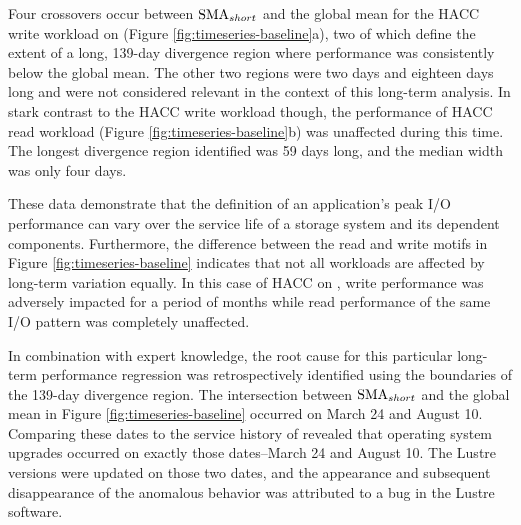 Four crossovers occur between $\textup{SMA}_{short}$ and the global mean for the HACC write workload on \cori (Figure \ref{fig:timeseries-baseline}a), two of which define the extent of a long, 139-day divergence region where performance was consistently below the global mean.
The other two regions were two days and eighteen days long and were not considered relevant in the context of this long-term analysis.
In stark contrast to the HACC write workload though, the performance of HACC read workload (Figure \ref{fig:timeseries-baseline}b) was unaffected during this time.
The longest divergence region identified was 59 days long, and the median width was only four days.

These data demonstrate that the definition of an application's peak I/O performance can vary over the service life of a storage system and its dependent components.
Furthermore, the difference between the read and write motifs in Figure \ref{fig:timeseries-baseline} indicates that not all workloads are affected by long-term variation equally. 
In this case of HACC on \cori, write performance was adversely impacted for a period of months while read performance of the same I/O pattern was completely unaffected.

In combination with expert knowledge, the root cause for this particular long-term performance regression was retrospectively identified using the boundaries of the 139-day divergence region.
The intersection between $\textup{SMA}_{short}$ and the global mean in Figure \ref{fig:timeseries-baseline} occurred on March 24 and August 10.
Comparing these dates to the service history of \cori revealed that operating system upgrades occurred on exactly those dates--March 24 and August 10.
The Lustre versions were updated on those two dates, and the appearance and subsequent disappearance of the anomalous behavior was attributed to a bug in the Lustre software.







